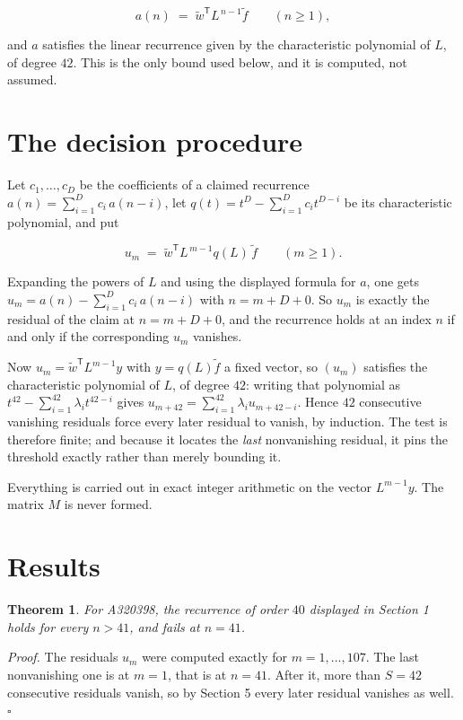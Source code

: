 \documentclass[11pt]{article}
\newtheorem{theorem}{Theorem}
\theoremstyle{definition}
\begin{document}
\[a(n) \;=\; \tilde w^{\mathsf T} L^{\,n-1} \tilde f \qquad (n \ge 1),\]

and $a$ satisfies the linear recurrence given by the characteristic polynomial of $L$, of degree $42$. This is the only bound used below, and it is computed, not assumed.

\section{The decision procedure}

Let $c_1,\dots,c_D$ be the coefficients of a claimed recurrence $a(n) = \sum_{i=1}^{D} c_i\,a(n-i)$, let $q(t) = t^{D} - \sum_{i=1}^{D} c_i t^{D-i}$ be its characteristic polynomial, and put

\[u_m \;=\; \tilde w^{\mathsf T} L^{\,m-1} q(L)\,\tilde f \qquad (m \ge 1).\]

Expanding the powers of $L$ and using the displayed formula for $a$, one gets $u_m = a(n) - \sum_{i=1}^{D} c_i\,a(n-i)$ with $n = m + D + 0$. So $u_m$ is exactly the residual of the claim at $n = m + D + 0$, and the recurrence holds at an index $n$ if and only if the corresponding $u_m$ vanishes.

Now $u_m = \tilde w^{\mathsf T} L^{m-1} y$ with $y = q(L)\tilde f$ a fixed vector, so $(u_m)$ satisfies the characteristic polynomial of $L$, of degree $42$: writing that polynomial as $t^{42} - \sum_{i=1}^{42} \lambda_i t^{42-i}$ gives $u_{m+42} = \sum_{i=1}^{42} \lambda_i u_{m+42-i}$. Hence $42$ consecutive vanishing residuals force every later residual to vanish, by induction. The test is therefore finite; and because it locates the {\itshape last} nonvanishing residual, it pins the threshold exactly rather than merely bounding it.

Everything is carried out in exact integer arithmetic on the vector $L^{m-1}y$. The matrix $M$ is never formed.

\section{Results}

\begin{theorem} For A320398, the recurrence of order $40$ displayed in Section 1 holds for every $n > 41$, and fails at $n = 41$.\end{theorem}

{\itshape Proof.} The residuals $u_m$ were computed exactly for $m = 1,\dots,107$. The last nonvanishing one is at $m = 1$, that is at $n = 41$. After it, more than $S = 42$ consecutive residuals vanish, so by Section 5 every later residual vanishes as well. $\square$
\end{document}
